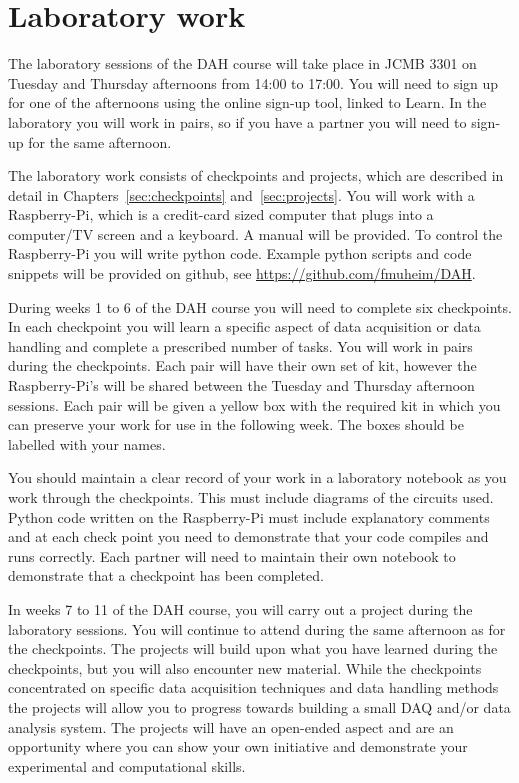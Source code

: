 \section{Laboratory work}

The laboratory sessions of the DAH course will take place in JCMB 3301 on Tuesday and Thursday afternoons from 14:00 to 17:00.  You will need to sign up for one of the afternoons using the online sign-up tool, linked to Learn. In the laboratory you will work in pairs, so if you have a partner you will need to sign-up for the same afternoon.

The laboratory work consists of checkpoints and projects, which are described in detail in Chapters~\ref{sec:checkpoints} and~\ref{sec:projects}.  You will work with a Raspberry-Pi, which is a credit-card sized computer that plugs into a computer/TV screen and a keyboard. A manual will be provided. To control the Raspberry-Pi you will write python code. Example python scripts and code snippets will be provided on github, see \url{https://github.com/fmuheim/DAH}. 

During weeks 1 to 6 of the DAH course you will need to complete six checkpoints. In each checkpoint you will learn a specific aspect of data acquisition or data handling and complete a prescribed number of tasks. You will work in pairs during the checkpoints.
Each pair will have their own set of kit, however the Raspberry-Pi's will be shared between the Tuesday and Thursday afternoon sessions. Each pair will be given a yellow box with the required kit in which you can preserve your work for use in the following week. The boxes should be labelled with your names.

You should maintain a clear record of your work in a laboratory notebook as you work through the checkpoints. This must include diagrams of the circuits used. Python code written on the Raspberry-Pi must include explanatory comments and at each check point you need to demonstrate that your code compiles and runs correctly.  Each partner will need to maintain their own notebook to demonstrate that a checkpoint has been completed. 


In weeks 7 to 11 of the DAH course, you will carry out a project during the laboratory sessions. You will continue to attend during the same afternoon as for the checkpoints.
The projects will build upon what you have learned during the checkpoints, but you will also encounter new material. While the checkpoints concentrated on specific data acquisition techniques and data handling methods the projects will allow you to progress towards building a small DAQ and/or data analysis system. The projects will have an open-ended aspect and are an opportunity where you can show your own initiative and demonstrate your experimental and computational skills. 

